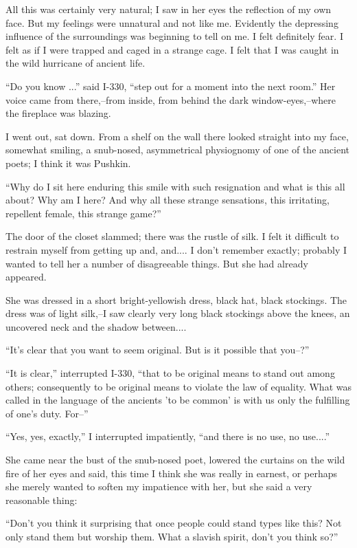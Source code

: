 \documentclass[11pt,openany]{book}
\begin{document}
All this was certainly very natural; I saw in her eyes the reflection of my own face. But my feelings were unnatural and not like me. Evidently the depressing influence of the surroundings was beginning to tell on me. I felt definitely fear. I felt as if I were trapped and caged in a strange cage. I felt that I was caught in the wild hurricane of ancient life.

``Do you know ...'' said I-330, ``step out for a moment into the next room.'' Her voice came from there,--from inside, from behind the dark window-eyes,--where the fireplace was blazing.

I went out, sat down. From a shelf on the wall there looked straight into my face, somewhat smiling, a snub-nosed, asymmetrical physiognomy of one of the ancient poets; I think it was Pushkin.

``Why do I sit here enduring this smile with such resignation and what is this all about? Why am I here? And why all these strange sensations, this irritating, repellent female, this strange game?''

The door of the closet slammed; there was the rustle of silk. I felt it difficult to restrain myself from getting up and, and.... I don't remember exactly; probably I wanted to tell her a number of disagreeable things. But she had already appeared.

She was dressed in a short bright-yellowish dress, black hat, black stockings. The dress was of light silk,--I saw clearly very long black stockings above the knees, an uncovered neck and the shadow between....

``It's clear that you want to seem original. But is it possible that you--?''

``It is clear,'' interrupted I-330, ``that to be original means to stand out among others; consequently to be original means to violate the law of equality. What was called in the language of the ancients 'to be common' is with us only the fulfilling of one's duty. For--''

``Yes, yes, exactly,'' I interrupted impatiently, ``and there is no use, no use....''

She came near the bust of the snub-nosed poet, lowered the curtains on the wild fire of her eyes and said, this time I think she was really in earnest, or perhaps she merely wanted to soften my impatience with her, but she said a very reasonable thing:

``Don't you think it surprising that once people could stand types like this? Not only stand them but worship them. What a slavish spirit, don't you think so?''
\end{document}
